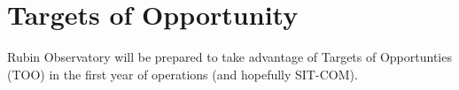 \section{Targets of Opportunity} 

Rubin Observatory will be prepared to take advantage of Targets of Opportunties (TOO) in the first year of operations (and hopefully SIT-COM). 
